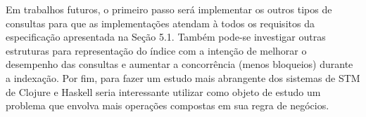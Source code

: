 Em trabalhos futuros, o primeiro passo será implementar os outros tipos de consultas para que as implementações atendam à todos os requisitos da especificação apresentada na Seção 5.1. Também pode-se investigar outras estruturas para representação do índice com a intenção de melhorar o desempenho das consultas e aumentar a concorrência (menos bloqueios) durante a indexação. Por fim, para fazer um estudo mais abrangente dos sistemas de STM de Clojure e Haskell seria interessante utilizar como objeto de estudo um problema que envolva mais operações compostas em sua regra de negócios.